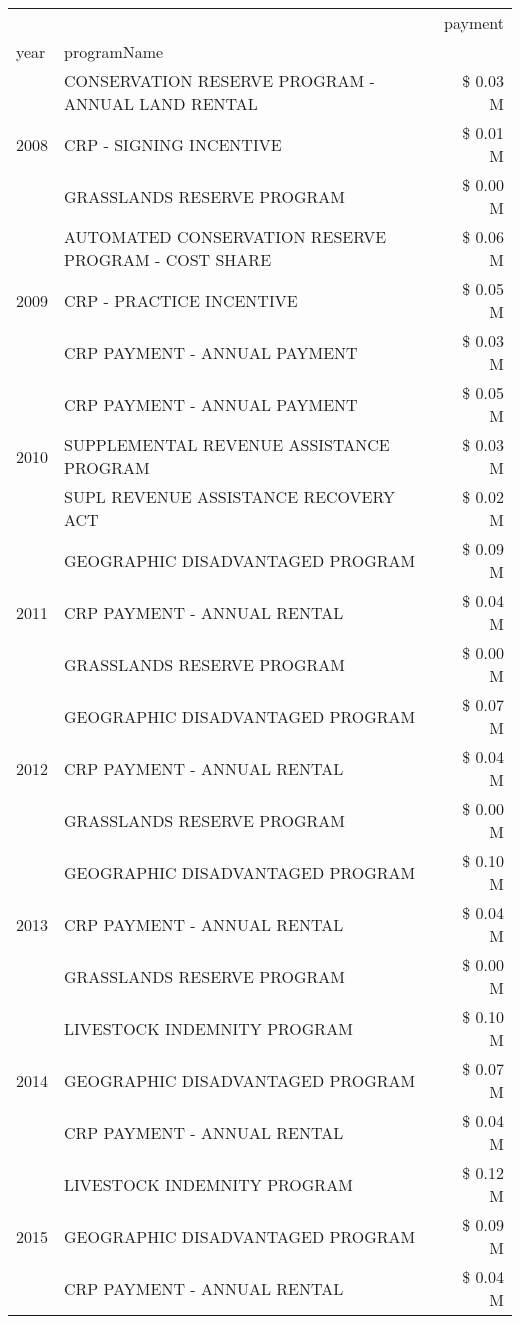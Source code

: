 \begin{tabular}{llr}
\toprule
 &  & payment \\
year & programName &  \\
\midrule
\multirow[t]{3}{*}{2008} & CONSERVATION RESERVE PROGRAM - ANNUAL LAND RENTAL & \$ 0.03 M \\
 & CRP - SIGNING INCENTIVE & \$ 0.01 M \\
 & GRASSLANDS RESERVE PROGRAM & \$ 0.00 M \\
\cline{1-3}
\multirow[t]{3}{*}{2009} & AUTOMATED CONSERVATION RESERVE PROGRAM - COST SHARE & \$ 0.06 M \\
 & CRP - PRACTICE INCENTIVE & \$ 0.05 M \\
 & CRP PAYMENT - ANNUAL PAYMENT & \$ 0.03 M \\
\cline{1-3}
\multirow[t]{3}{*}{2010} & CRP PAYMENT - ANNUAL PAYMENT & \$ 0.05 M \\
 & SUPPLEMENTAL REVENUE ASSISTANCE PROGRAM & \$ 0.03 M \\
 & SUPL REVENUE ASSISTANCE RECOVERY ACT & \$ 0.02 M \\
\cline{1-3}
\multirow[t]{3}{*}{2011} & GEOGRAPHIC DISADVANTAGED PROGRAM & \$ 0.09 M \\
 & CRP PAYMENT - ANNUAL RENTAL & \$ 0.04 M \\
 & GRASSLANDS RESERVE PROGRAM & \$ 0.00 M \\
\cline{1-3}
\multirow[t]{3}{*}{2012} & GEOGRAPHIC DISADVANTAGED PROGRAM & \$ 0.07 M \\
 & CRP PAYMENT - ANNUAL RENTAL & \$ 0.04 M \\
 & GRASSLANDS RESERVE PROGRAM & \$ 0.00 M \\
\cline{1-3}
\multirow[t]{3}{*}{2013} & GEOGRAPHIC DISADVANTAGED PROGRAM & \$ 0.10 M \\
 & CRP PAYMENT - ANNUAL RENTAL & \$ 0.04 M \\
 & GRASSLANDS RESERVE PROGRAM & \$ 0.00 M \\
\cline{1-3}
\multirow[t]{3}{*}{2014} & LIVESTOCK INDEMNITY PROGRAM & \$ 0.10 M \\
 & GEOGRAPHIC DISADVANTAGED PROGRAM & \$ 0.07 M \\
 & CRP PAYMENT - ANNUAL RENTAL & \$ 0.04 M \\
\cline{1-3}
\multirow[t]{3}{*}{2015} & LIVESTOCK INDEMNITY PROGRAM & \$ 0.12 M \\
 & GEOGRAPHIC DISADVANTAGED PROGRAM & \$ 0.09 M \\
 & CRP PAYMENT - ANNUAL RENTAL & \$ 0.04 M \\

\end{tabular}
